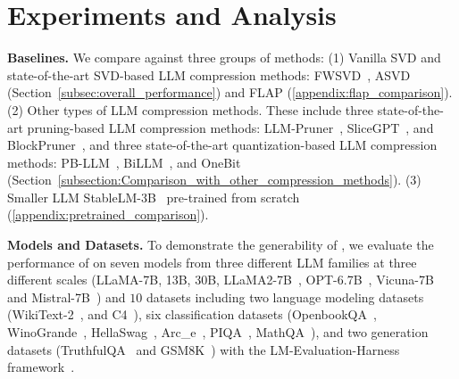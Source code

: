 \section{Experiments and Analysis}
\label{sec:experiments}
\vspace{-1mm}

\textbf{Baselines.}
%
We compare \sysname against three groups of methods: (1) Vanilla SVD and state-of-the-art SVD-based LLM compression methods: FWSVD~\citep{DBLP:conf/iclr/HsuHCLSJ22}, ASVD~\citep{DBLP:journals/corr/abs-2312-05821} (Section~\ref{subsec:overall_performance}) and FLAP (\cref{appendix:flap_comparison}).
%
(2) Other types of LLM compression methods. These include three state-of-the-art pruning-based LLM compression methods: LLM-Pruner~\citep{DBLP:conf/nips/MaFW23}, SliceGPT~\citep{DBLP:conf/iclr/AshkboosCNHH24}, and BlockPruner~\citep{DBLP:journals/corr/abs-2406-10594}, and three state-of-the-art quantization-based LLM compression methods: PB-LLM~\citep{DBLP:conf/iclr/YuanSD24}, BiLLM~\citep{DBLP:conf/icml/HuangLQLZ0M024}, and OneBit~\citep{DBLP:conf/nips/Xu0YWZLLC24} (Section~\ref{subsection:Comparison_with_other_compression_methods}). 
%
(3) Smaller LLM StableLM-3B~\citep{StableLM-3B-4E1T} pre-trained from scratch (\cref{appendix:pretrained_comparison}).

\textbf{Models and Datasets.} 
%
To demonstrate the generability of \sysname, we evaluate the performance of \sysname on seven models from three different LLM families at three different scales (LLaMA-7B, 13B, 30B, LLaMA2-7B~\citep{DBLP:journals/corr/abs-2307-09288}, OPT-6.7B~\citep{DBLP:journals/corr/abs-2205-01068}, Vicuna-7B~\citep{vicuna2023} and Mistral-7B~\citep{DBLP:journals/corr/abs-2310-06825}) and $10$ datasets including two language modeling datasets (WikiText-2~\citep{DBLP:conf/iclr/MerityX0S17}, and C4~\citep{DBLP:journals/jmlr/RaffelSRLNMZLL20}), six classification datasets (OpenbookQA~\citep{DBLP:conf/emnlp/MihaylovCKS18}, WinoGrande~\citep{DBLP:conf/aaai/SakaguchiBBC20}, HellaSwag~\citep{DBLP:conf/acl/ZellersHBFC19}, Arc\_e~\citep{DBLP:journals/corr/abs-1803-05457}, PIQA~\citep{DBLP:conf/aaai/BiskZLGC20}, MathQA~\citep{DBLP:conf/naacl/AminiGLKCH19}),  and two generation datasets (TruthfulQA~\citep{DBLP:conf/acl/LinHE22} and GSM8K~\citep{DBLP:journals/corr/abs-2110-14168}) with the LM-Evaluation-Harness framework~\citep{eval-harness}.


